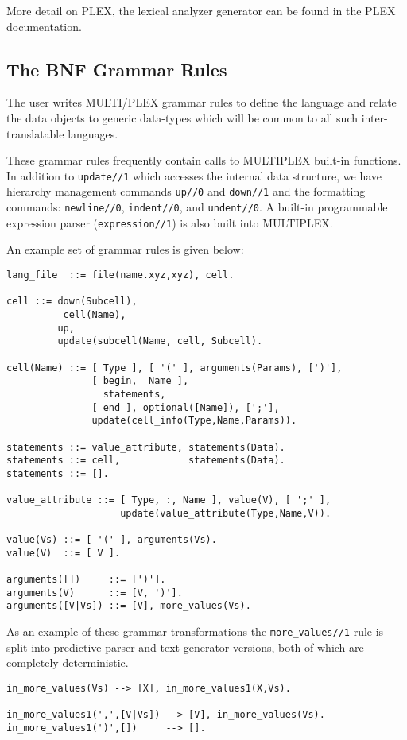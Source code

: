 More detail on PLEX, the lexical analyzer generator
can be found in the PLEX documentation.

\subsection{The BNF Grammar Rules}

The user writes MULTI/PLEX grammar rules to 
define the language and relate the
data objects to generic data-types which will be
common to all such inter-translatable languages.

These grammar rules frequently contain calls to 
MULTIPLEX built-in functions. In addition to
{\tt update//1} which accesses the internal
data structure, we have hierarchy management
commands {\tt up//0} and {\tt down//1} and the
formatting commands: {\tt newline//0}, {\tt indent//0},
and {\tt undent//0}. A built-in programmable expression
parser ({\tt expression//1}) is also built into MULTIPLEX.

An example set of grammar rules is given below:
\begin{verbatim}
lang_file  ::= file(name.xyz,xyz), cell.

cell ::= down(Subcell),
          cell(Name),
         up,
         update(subcell(Name, cell, Subcell).

cell(Name) ::= [ Type ], [ '(' ], arguments(Params), [')'],
               [ begin,  Name ],
                 statements,
               [ end ], optional([Name]), [';'],
               update(cell_info(Type,Name,Params)).

statements ::= value_attribute, statements(Data).
statements ::= cell,            statements(Data).
statements ::= [].

value_attribute ::= [ Type, :, Name ], value(V), [ ';' ],
                    update(value_attribute(Type,Name,V)).

value(Vs) ::= [ '(' ], arguments(Vs).
value(V)  ::= [ V ].

arguments([])     ::= [')'].
arguments(V)      ::= [V, ')'].
arguments([V|Vs]) ::= [V], more_values(Vs).
\end{verbatim}

As an example of these grammar transformations
the {\tt more\_values//1} rule is split into
predictive parser and text generator versions,
both of which are completely deterministic.

\begin{verbatim}
in_more_values(Vs) --> [X], in_more_values1(X,Vs).

in_more_values1(',',[V|Vs]) --> [V], in_more_values(Vs).
in_more_values1(')',[])     --> [].
\end{verbatim}

